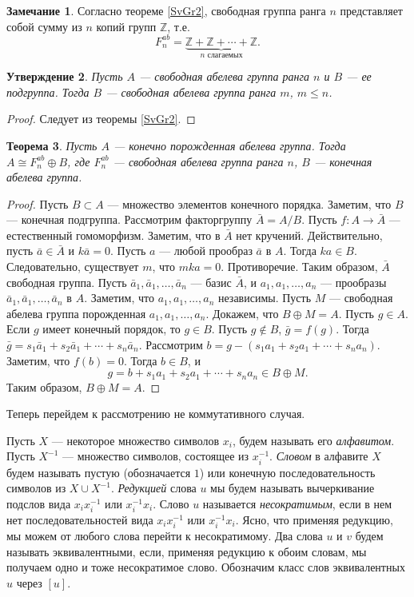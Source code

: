 \documentclass[12pt, titlepage, oneside]{amsbook}
\newcommand{\ZZ}{\mathbb{Z}}
\newtheorem{theorem}{Теорема}[chapter]
\newtheorem{claim}[theorem]{Утверждение}
\theoremstyle{definition}
\newtheorem{remark}[theorem]{Замечание}
\theoremstyle{remark}
\begin{document}
\begin{remark}
	Согласно теореме \ref{SvGr2}, свободная группа ранга $n$ представляет собой сумму из $n$ копий групп $\ZZ$, т.е. $$F_n^{ab}=\underbrace{\ZZ+\ZZ+\cdots+\ZZ}_{\text{$n$ слагаемых}}.$$
\end{remark}

\begin{claim}
	\label{SvGr3} Пусть $A$ --- свободная абелева группа ранга $n$ и $B$ --- ее подгруппа. Тогда $B$ --- свободная абелева группа ранга $m$, $m\leq n$.
\end{claim}

\begin{proof}
	Следует из теоремы \ref{SvGr2}.
\end{proof}

\begin{theorem}
	\label{SvGr4} Пусть $A$ --- конечно порожденная абелева группа. Тогда $A\cong F_n^{ab}\oplus B$, где $F_n^{ab}$ --- свободная абелева группа ранга $n$, $B$ --- конечная абелева группа.
\end{theorem}

\begin{proof}
	Пусть $B\subset A$ --- множество элементов конечного порядка. Заметим, что $B$ --- конечная подгруппа. Рассмотрим факторгруппу $\bar{A}=A/B$. Пусть $f\colon A\rightarrow\bar{A}$ --- естественный гомоморфизм. Заметим, что в $\bar{A}$ нет кручений. Действительно, пусть $\bar{a}\in\bar{A}$ и $k\bar{a}=0$. Пусть $a$ --- любой прообраз $\bar{a}$ в $A$. Тогда $ka\in B$. Следовательно, существует $m$, что $mka=0$. Противоречие. Таким образом, $\bar{A}$ свободная группа. Пусть $\bar{a}_1,\bar{a}_1,\ldots,\bar{a}_n$ --- базис $\bar{A}$, и $a_1,a_1,\ldots,a_n$ --- прообразы $\bar{a}_1,\bar{a}_1,\ldots,\bar{a}_n$ в $A$. Заметим, что $a_1,a_1,\ldots,a_n$ независимы. Пусть $M$ --- свободная абелева группа порожденная $a_1,a_1,\ldots,a_n$. Докажем, что $B\oplus M=A$. Пусть $g\in A$. Если $g$ имеет конечный порядок, то $g\in B$. Пусть $g\not\in B$, $\bar{g}=f(g)$. Тогда $\bar{g}=s_1\bar{a}_1+s_2\bar{a}_1+\cdots+s_n\bar{a}_n$. Рассмотрим $b=g-(s_1a_1+s_2a_1+\cdots+s_na_n)$. Заметим, что $f(b)=0$. Тогда $b\in B$, и $$g=b+s_1a_1+s_2a_1+\cdots+s_na_n\in B\oplus M.$$ Таким образом, $B\oplus M=A$.
\end{proof}

Теперь перейдем к рассмотрению не коммутативного случая.

Пусть $X$ --- некоторое множество символов $x_i$, будем называть его \emph{алфавитом}. Пусть $X^{-1}$ --- множество символов, состоящее из $x^{-1}_i$. \emph{Словом} в алфавите $X$ будем называть пустую (обозначается $1$) или конечную последовательность символов из $X\cup X^{-1}$. \emph{Редукцией} слова $u$ мы будем называть вычеркивание подслов вида $x_i x^{-1}_i$ или $x^{-1}_ix_i$. Слово $u$ называется \emph{несократимым}, если в нем нет последовательностей вида $x_i x^{-1}_i$ или $x^{-1}_ix_i$. Ясно, что применяя редукцию, мы можем от любого слова перейти к несократимому. Два слова $u$ и $v$ будем называть эквивалентными, если, применяя редукцию к обоим словам, мы получаем одно и тоже несократимое слово. Обозначим класс слов эквивалентных $u$ через $[u]$.
\end{document}
